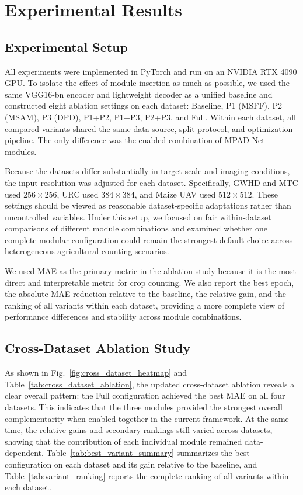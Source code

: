 \documentclass[a4paper,fleqn]{cas-sc}
\begin{document}
	\section{Experimental Results}
	
	\subsection{Experimental Setup}
	
	All experiments were implemented in PyTorch and run on an NVIDIA RTX 4090 GPU. To isolate the effect of module insertion as much as possible, we used the same VGG16-bn encoder and lightweight decoder as a unified baseline and constructed eight ablation settings on each dataset: Baseline, P1 (MSFF), P2 (MSAM), P3 (DPD), P1+P2, P1+P3, P2+P3, and Full. Within each dataset, all compared variants shared the same data source, split protocol, and optimization pipeline. The only difference was the enabled combination of MPAD-Net modules.
	
	Because the datasets differ substantially in target scale and imaging conditions, the input resolution was adjusted for each dataset. Specifically, GWHD and MTC used $256\times256$, URC used $384\times384$, and Maize UAV used $512\times512$. These settings should be viewed as reasonable dataset-specific adaptations rather than uncontrolled variables. Under this setup, we focused on fair within-dataset comparisons of different module combinations and examined whether one complete modular configuration could remain the strongest default choice across heterogeneous agricultural counting scenarios.
	
	We used MAE as the primary metric in the ablation study because it is the most direct and interpretable metric for crop counting. We also report the best epoch, the absolute MAE reduction relative to the baseline, the relative gain, and the ranking of all variants within each dataset, providing a more complete view of performance differences and stability across module combinations.
	
	\subsection{Cross-Dataset Ablation Study}
	
	As shown in Fig.~\ref{fig:cross_dataset_heatmap} and Table~\ref{tab:cross_dataset_ablation}, the updated cross-dataset ablation reveals a clear overall pattern: the Full configuration achieved the best MAE on all four datasets. This indicates that the three modules provided the strongest overall complementarity when enabled together in the current framework. At the same time, the relative gains and secondary rankings still varied across datasets, showing that the contribution of each individual module remained data-dependent. Table~\ref{tab:best_variant_summary} summarizes the best configuration on each dataset and its gain relative to the baseline, and Table~\ref{tab:variant_ranking} reports the complete ranking of all variants within each dataset.
	
\end{document}
